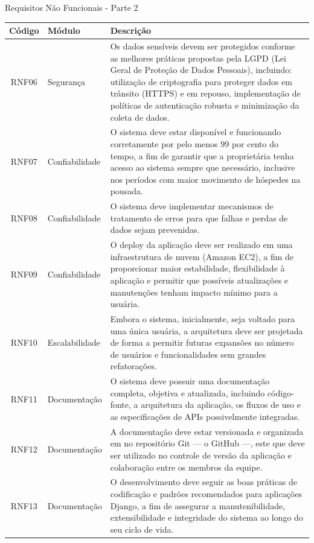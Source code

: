 \documentclass[
	12pt,				%
	openany,			%
	twoside,			%
	a4paper,			%
	english,			%
	french,				%
	spanish,			%
	brazil				%
	]{abntex2}
\begin{document}
\begin{quadro}[H]
	\caption{\label{quadro_rnf2}Requisitos Não Funcionais - Parte 2}
	\begin{tabular}{|c|p{4cm}|p{8cm}|}
		\hline
		\textbf{Código} & \textbf{Módulo} & \textbf{Descrição} \\ \hline
		RNF06 & Segurança & Os dados sensíveis devem ser protegidos conforme as melhores práticas propostas pela LGPD (Lei Geral de Proteção de Dados Pessoais), incluindo: utilização de criptografia para proteger dados em trânsito (HTTPS) e em repouso, implementação de políticas de autenticação robusta e minimização da coleta de dados. \\ \hline
		RNF07 & Confiabilidade & O sistema deve estar disponível e funcionando corretamente por pelo menos 99 por cento do tempo, a fim de garantir que a proprietária tenha acesso ao sistema sempre que necessário, inclusive nos períodos com maior movimento de hóspedes na pousada. \\ \hline
		RNF08 & Confiabilidade & O sistema deve implementar mecanismos de tratamento de erros para que falhas e perdas de dados sejam prevenidas. \\ \hline
		RNF09 & Confiabilidade & O deploy da aplicação deve ser realizado em uma infraestrutura de nuvem (Amazon EC2), a fim de proporcionar maior estabilidade, flexibilidade à aplicação e permitir que possíveis atualizações e manutenções tenham impacto mínimo para a usuária. \\ \hline
		RNF10 & Escalabilidade & Embora o sistema, inicialmente, seja voltado para uma única usuária, a arquitetura deve ser projetada de forma a permitir futuras expansões no número de usuários e funcionalidades sem grandes refatorações. \\ \hline
		RNF11 & Documentação & O sistema deve possuir uma documentação completa, objetiva e atualizada, incluindo código-fonte, a arquitetura da aplicação, os fluxos de uso e as especificações de APIs possivelmente integradas. \\ \hline
		RNF12 & Documentação & A documentação deve estar versionada e organizada em no repositório Git — o GitHub —, este que deve ser utilizado no controle de versão da aplicação e colaboração entre os membros da equipe. \\ \hline
		RNF13 & Documentação & O desenvolvimento deve seguir as boas práticas de codificação e padrões recomendados para aplicações Django, a fim de assegurar a manutenibilidade, extensibilidade e integridade do sistema ao longo do seu ciclo de vida. \\ \hline
	\end{tabular}
\end{quadro}
\end{document}
